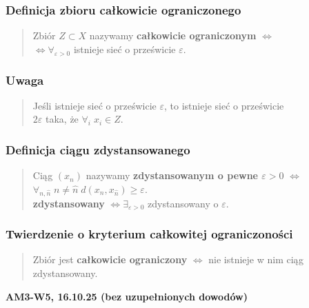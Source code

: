 \documentclass[10pt,a4paper]{article}
\newcommand{\zagadnienie}[3]{%
    \clearpage %
    \noindent\textbf{#1} #2\\
    #3
}
\begin{document}
{    \subsubsection*{Definicja zbioru całkowicie ograniczonego}
    \begin{quote}
    Zbiór $Z \subset X$ nazywamy \textbf{całkowicie ograniczonym} $\iff$ \\
    $\iff \forall_{\varepsilon > 0}$ istnieje sieć o prześwicie $\varepsilon$.
    \end{quote}

    \subsubsection*{Uwaga}
    \begin{quote}
    Jeśli istnieje sieć o prześwicie $\varepsilon$, to istnieje sieć o prześwicie \\
    $2\varepsilon$ taka, że $\forall_{i} \; x_i \in Z$.
    \end{quote}

    \subsubsection*{Definicja ciągu zdystansowanego}
    \begin{quote}
    Ciąg $(x_n)$ nazywamy \textbf{zdystansowanym o pewne $\varepsilon > 0$} $\iff$ \\
    $\forall_{n, \hat{n}} \; n \ne \hat{n} \; d(x_n, x_{\hat{n}}) \ge \varepsilon$. \\
    \textbf{zdystansowany} $\iff \exists_{\varepsilon > 0}$ zdystansowany o $\varepsilon$.
    \end{quote}

    \subsubsection*{Twierdzenie o kryterium całkowitej ograniczoności}
    \begin{quote}
    Zbiór jest \textbf{całkowicie ograniczony} $\iff$ nie istnieje w nim ciąg zdystansowany.
    \end{quote}
}
\zagadnienie{AM3-W5, 16.10.25 (bez uzupełnionych dowodów)}{}
\end{document}
